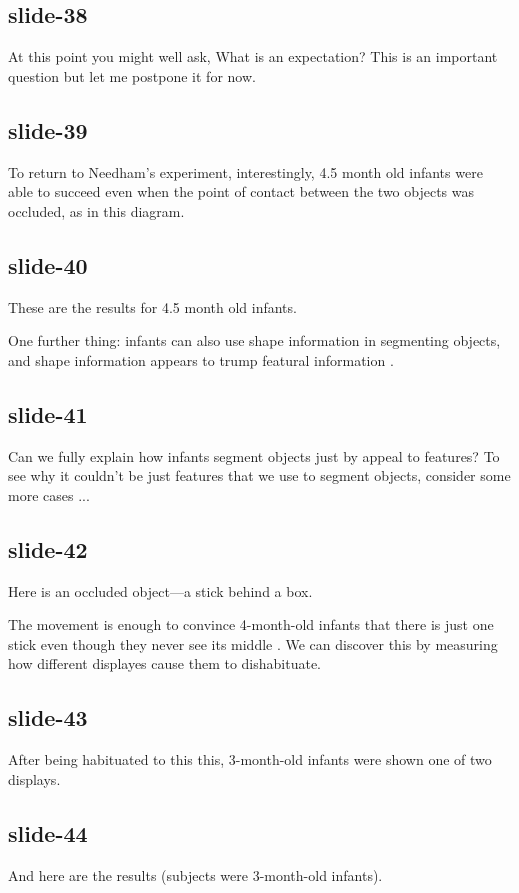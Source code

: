 \documentclass[12pt,\papersize]{extarticle}
\begin{document}
\subsection{slide-38}
At this point you might well ask, What is an expectation?
This is an important question but let me postpone it for now.
 
\subsection{slide-39}
To return to Needham's experiment, interestingly, 4.5 month old infants were able to succeed 
even when the point of contact between the two objects was occluded, as in this diagram.
 
\subsection{slide-40}
These are the results for 4.5 month old infants.
 
One further thing: infants can also use shape information in segmenting objects, and shape information appears to trump featural information \citep{needham:1999_role}.
 
\subsection{slide-41}
Can we fully explain how infants segment objects just by appeal to features?
To see why it couldn't be just features that we use to segment objects, consider 
some more cases ...
 
\subsection{slide-42}
Here is an occluded object---a stick behind a box.
 
The movement is enough to convince 4-month-old infants that there is just one stick even 
though they never see its middle \citep{kellman:1983_perception}.
We can discover this by measuring how different displayes cause them to dishabituate.
 
\subsection{slide-43}
After being habituated to this this, 3-month-old infants were shown one of two displays.
 
\subsection{slide-44}
And here are the results (subjects were 3-month-old infants).
 
\end{document}
